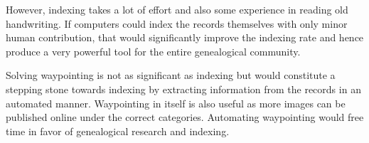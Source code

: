 However, indexing takes a lot of effort and also some experience in reading old handwriting. If computers could index the records themselves with only minor human contribution, that would significantly improve the indexing rate and hence produce a very powerful tool for the entire genealogical community.

Solving waypointing is not as significant as indexing but would constitute a stepping stone towards indexing by extracting information from the records in an automated manner.
Waypointing in itself is also useful as more images can be published online under the correct categories. Automating waypointing would free time in favor of genealogical research and indexing.
